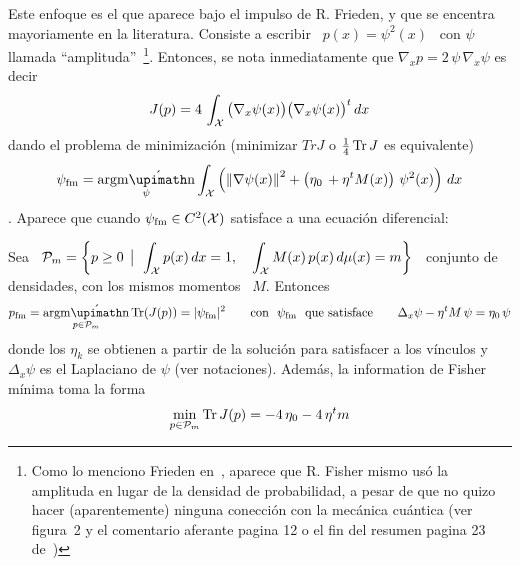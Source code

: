 Este enfoque es el que aparece bajo el impulso de R.  Frieden, y que se encentra
mayoriamente en la  literatura.  Consiste a escribir \ $p(x)  = \psi^2(x)$ \ con
$\psi$    llamada     ``amplituda''~\footnote{Como    lo     menciono    Frieden
en~\cite{FriSof95}, aparece que  R. Fisher mismo us\'o la amplituda  en lugar de
la  densidad de  probabilidad, a  pesar de  que no  quizo hacer  (aparentemente)
ninguna conecci\'on con  la mec\'anica cu\'antica (ver figura~2  y el comentario
aferante  pagina  12  o  el  fin del  resumen  pagina  23  de~\cite{FisMat43})}.
Entonces,  se nota  inmediatamente que  $\nabla_x  p  = 2  \,
\psi  \,   \nabla_x  \psi $ es decir
%
\[
J(p)  = 4 \, \int_{\mathcal{X}} \big( \nabla_x \psi(x) \big) \big( \nabla_x \psi(x) \big)^t
\, dx
\]
%
dando  el problema  de minimizaci\'on  (minimizar $Tr  J$ o  $\frac14 \operatorname{Tr}  J$ es
equivalente)
%
\[
\psi_{\mathrm{fm}} = \argmin_\psi \int_\X \left( \left\| \nabla \psi(x) \right\|^2
+ \left( \eta_0 \, + \eta^t M(x) \right) \, \psi^2(x) \right) \, dx
\]
%
.    Aparece    que    cuando
$\psi_{\mathrm{fm}} \in C^2(\mathcal{X})$ satisface a una ecuaci\'on diferencial:
%
\begin{corolario}
\label{Cor:SZ:MinFisherSchrodinger}
%
Sea  \  $\displaystyle  \mathcal{P}_m =  \left\{  p  \ge  0  \:\: \big| \:\:   \int_{\mathcal{X}} p(x)  \,  dx  =
  1,  \quad  \int_{\mathcal{X}} M(x)  \,  p(x)  \, d\mu(x)  =  m  \right\}$ \  conjunto  de
  densidades, con los mismos momentos \ $M$. Entonces
  \[
  p_{\mathrm{fm}}      =     \argmin_{p      \in      \P_m}     \Tr(J(p))      =
  |\psi_{\mathrm{fm}}|^2   \qquad  \mbox{con   \   $\psi_{\mathrm{fm}}$  \   que
  satisface} \qquad \Delta_x \psi - \eta^t M \, \psi = \eta_0 \, \psi
  \]
  donde los $\eta_k$ se obtienen a partir de la soluci\'on para satisfacer a los
  v\'inculos   y   $\Delta_x    \psi$   es   el   Laplaciano    de   $\psi$   (ver
  notaciones). Adem\'as, la information de Fisher m\'inima toma la forma
%
\[
\min_{p \in \mathcal{P}_m} \operatorname{Tr} J(p) = - 4 \, \eta_0 - 4 \, \eta^t m
\]
\end{corolario}
%
